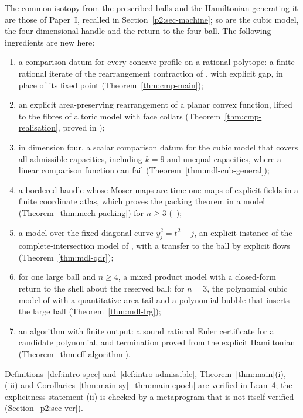 The common isotopy from the prescribed balls and the Hamiltonian generating it are those of Paper~I, recalled in
Section~\ref{p2:sec-machine}; so are the cubic model, the four-dimensional handle and the return to the four-ball.
The following ingredients are new here:
\begin{enumerate}[label=(\arabic*),leftmargin=*]
\item a comparison datum for every concave profile on a rational polytope: a finite rational iterate of the
 rearrangement contraction of \cite[\S2]{OpenAI2026}, with explicit gap, in place of its fixed point
 (Theorem~\ref{thm:cmp-main});
\item an explicit area-preserving rearrangement of a planar convex function, lifted to the fibres of a toric model
 with face collars (Theorem~\ref{thm:cmp-realisation}, proved in );
\item in dimension four, a scalar comparison datum for the cubic model that covers all admissible capacities, including
 $k=9$ and unequal capacities, where a linear comparison function can fail (Theorem~\ref{thm:mdl-cub-general});
\item a bordered handle whose Moser maps are time-one maps of explicit fields in a finite coordinate atlas, which
 proves the packing theorem in a model (Theorem~\ref{thm:mech-packing}) for $n\ge3$
 (--);
\item a model over the fixed diagonal curve $y_j^2=t^2-j$, an explicit instance of the complete-intersection model of
 \cite[\S5.2]{OpenAI2026}, with a transfer to the ball by explicit flows (Theorem~\ref{thm:mdl-qdr});
\item for one large ball and $n\ge4$, a mixed product model with a closed-form return to the shell about the reserved
 ball; for $n=3$, the polynomial cubic model of \cite{OpenAI2026} with a quantitative area tail and a polynomial
 bubble that inserts the large ball (Theorem~\ref{thm:mdl-lrg});
\item an algorithm with finite output: a sound rational Euler certificate for a candidate polynomial, and termination
 proved from the explicit Hamiltonian (Theorem~\ref{thm:eff-algorithm}).
\end{enumerate}
Definitions~\ref{def:intro-spec} and~\ref{def:intro-admissible}, Theorem~\ref{thm:main}(i), (iii) and
Corollaries~\ref{thm:main-sy}--\ref{thm:main-epoch} are verified in Lean~4; the explicitness statement (ii) is
checked by a metaprogram that is not itself verified (Section~\ref{p2:sec-ver}).

